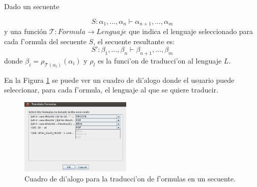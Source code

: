 Dado un secuente 

$$ S: \alpha_1,\ldots,\alpha_n \vdash \alpha_{n+1},\ldots,\alpha_m $$
y una función  $\mathcal{T}:Formula\rightarrow Lenguaje$ que indica el lenguaje seleccionado para cada f'ormula del secuente $S$, el secuente resultante es:
$$ S': \beta_1,\ldots,\beta_n \vdash \beta_{n+1},\ldots,\beta_m $$
donde 
$\beta_{i} = \rho_{\mathcal{T}(\alpha_i)}(\alpha_i)$ y $\rho_l$ es la funci'on de traducci'on al lenguaje $L$.

En la Figura \ref{GUI form translation} se puede ver un cuadro de di'alogo donde el usuario puede seleccionar, para cada f'ormula, el lenguaje al que se quiere traducir.

\begin{figure}[tbh]
	\includegraphics[width=200px]{img/translate.png}
	\centering
	\caption{Cuadro de di'alogo para la traducci'on de f'ormulas en un secuente.} \label{GUI form translation}
\end{figure}

